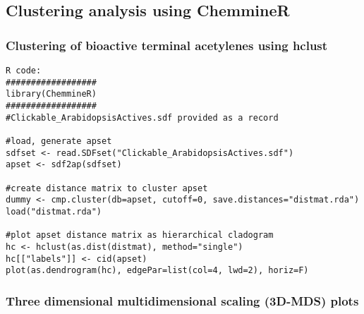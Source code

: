 \clearpage
\subsection{Clustering analysis using ChemmineR}

\subsubsection{Clustering of bioactive terminal acetylenes using hclust}

\begin{verbatim}
R code:
##################
library(ChemmineR)
##################
#Clickable_ArabidopsisActives.sdf provided as a record

#load, generate apset
sdfset <- read.SDFset("Clickable_ArabidopsisActives.sdf")
apset <- sdf2ap(sdfset)

#create distance matrix to cluster apset
dummy <- cmp.cluster(db=apset, cutoff=0, save.distances="distmat.rda")
load("distmat.rda")

#plot apset distance matrix as hierarchical cladogram
hc <- hclust(as.dist(distmat), method="single")
hc[["labels"]] <- cid(apset) 
plot(as.dendrogram(hc), edgePar=list(col=4, lwd=2), horiz=F) 
\end{verbatim}

\subsubsection{Three dimensional multidimensional scaling (3D-MDS) plots}

